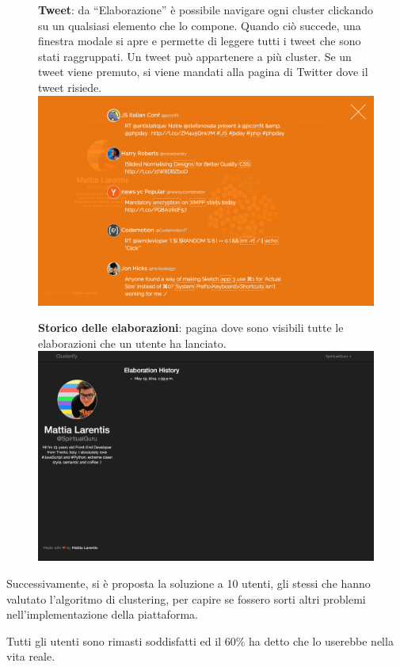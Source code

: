         	\begin{figure}[p]
		\textbf{Tweet}: da ``Elaborazione'' è possibile navigare ogni cluster clickando su un qualsiasi elemento che lo compone. Quando ciò succede, una finestra modale si apre e permette di leggere tutti i tweet che sono stati raggruppati. Un tweet può appartenere a più cluster. Se un tweet viene premuto, si viene mandati alla pagina di Twitter dove il tweet risiede.\\

        		\includegraphics[width=\textwidth]{img/clusterify/tweet.png}
        	\end{figure}
        
        	\begin{figure}[p]
		\textbf{Storico delle elaborazioni}: pagina dove sono visibili tutte le elaborazioni che un utente ha lanciato.\\

        		\includegraphics[width=\textwidth]{img/clusterify/history.png}
        	\end{figure}            
	
	\newpage
	Successivamente, si è proposta la soluzione a 10 utenti, gli stessi che hanno valutato l'algoritmo di clustering, per capire se fossero sorti altri problemi nell'implementazione della piattaforma. 

	Tutti gli utenti sono rimasti soddisfatti ed il 60\% ha detto che lo userebbe nella vita reale.

